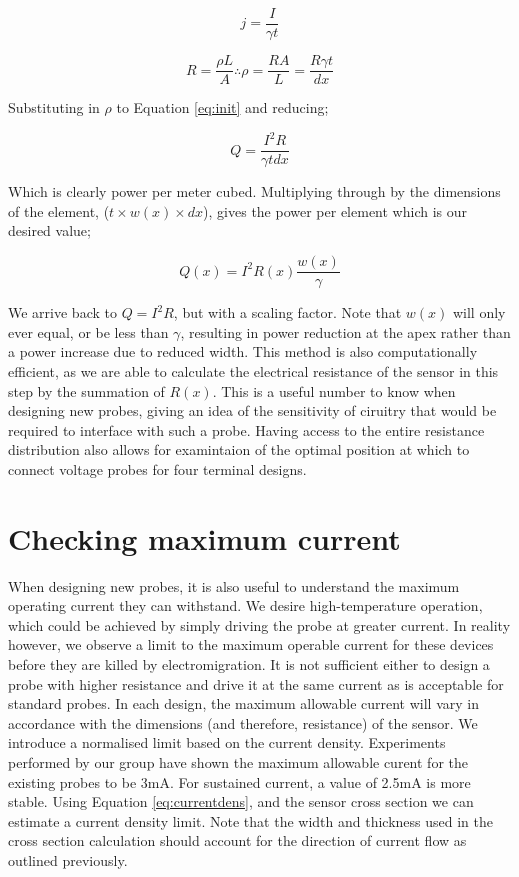 \documentclass[]{report}
\begin{document}
\begin{equation}\label{eq:currentdens}
j=\frac{I}{\gamma t}
\end{equation}

\begin{equation}
R=\frac{\rho L}{A} \therefore \rho=\frac{RA}{L} = \frac{R \gamma t}{dx}
\end{equation}

Substituting in $\rho$ to Equation \ref{eq:init} and reducing;

\begin{equation}
Q  = \frac{I^2 R}{\gamma t dx}
\end{equation}

Which is clearly power per meter cubed. Multiplying through by the dimensions of the element, ($t \times w(x) \times dx $), gives the power per element which is our desired value;

\begin{equation}
Q(x) = I^2R(x)\frac{w(x)}{\gamma}
\end{equation}

We arrive back to $Q=I^2R$, but with a scaling factor. Note that $w(x)$ will only ever equal, or be less than $\gamma$, resulting in power reduction at the apex rather than a power increase due to reduced width. This method is also computationally efficient, as we are able to calculate the electrical resistance of the sensor in this step by the summation of $R(x)$. This is a useful number to know when designing new probes, giving an idea of the sensitivity of ciruitry that would be required to interface with such a probe. Having access to the entire resistance distribution also allows for examintaion of the optimal position at which to connect voltage probes for four terminal designs.

\section{Checking maximum current}
When designing new probes, it is also useful to understand the maximum operating current they can withstand. We desire high-temperature operation, which could be achieved by simply driving the probe at greater current. In reality however, we observe a limit to the maximum operable current for these devices before they are killed by electromigration. It is not sufficient either to design a probe with higher resistance and drive it at the same current as is acceptable for standard probes. In each design, the maximum allowable current will vary in accordance with the dimensions (and therefore, resistance) of the sensor. We introduce a normalised limit based on the current density. Experiments performed by our group have shown the maximum allowable curent for the existing probes to be 3mA. For sustained current, a value of 2.5mA is more stable. Using Equation \ref{eq:currentdens}, and the sensor cross section we can estimate a current density limit. Note that the width and thickness used in the cross section calculation should account for the direction of current flow as outlined previously.
\end{document}
